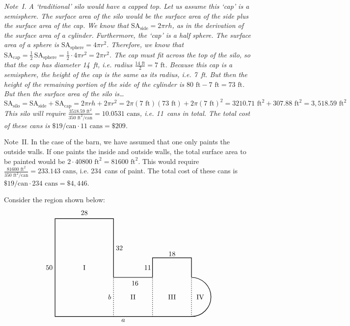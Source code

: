 \documentclass[11pt,letterpaper]{article}
\begin{document}
{\itshape
Note~I. A `traditional' silo would have a capped top. Let us assume this `cap' is a semisphere. The surface area of the silo would be the surface area of the side plus the surface area of the cap. We know that $\text{SA}_{\text{side}}= 2\pi rh$, as in the derivation of the surface area of a cylinder. Furthermore, the `cap' is a half sphere. The surface area of a sphere is $\text{SA}_{\text{sphere}}= 4\pi r^2$. Therefore, we know that $\text{SA}_{\text{cap}}= \frac{1}{2}\, \text{SA}_{\text{sphere}}= \frac{1}{2} \cdot 4\pi r^2= 2 \pi r^2$. The cap must fit across the top of the silo, so that the cap has diameter 14~ft, i.e. radius $\frac{14 \text{ ft}}{2}= 7 \text{ ft}$. Because this cap is a semisphere, the height of the cap is the same as its radius, i.e. 7~ft. But then the height of the remaining portion of the side of the cylinder is $80 \text{ ft} - 7 \text{ ft}= 73 \text{ ft}$. But then the surface area of the silo is\dots
	\[
	\text{SA}_{\text{silo}}= \text{SA}_{\text{side}} + \text{SA}_{\text{cap}}= 2\pi rh + 2\pi r^2= 2 \pi (7 \text{ ft}) (73 \text{ ft}) + 2 \pi (7 \text{ ft})^2= 3210.71 \text{ ft}^2 + 307.88 \text{ ft}^2= 3,\!518.59 \text{ ft}^2
	\]
This silo will require $\frac{3518.59 \text{ ft}^2}{350 \text{ ft}^2/\text{can}}= 10.0531 \text{ cans}$, i.e. 11~cans in total. The total cost of these cans is $\$19/\text{can} \cdot 11 \text{ cans}= \$209$. \pspace

Note~II. In the case of the barn, we have assumed that one only paints the outside walls. If one paints the inside and outside walls, the total surface area to be painted would be $2 \cdot 40800 \text{ ft}^2= 81600 \text{ ft}^2$. This would require $\frac{81600 \text{ ft}^2}{350 \text{ ft}^2/\text{can}}= 233.143 \text{ cans}$, i.e. 234~cans of paint. The total cost of these cans is $\$19/\text{can} \cdot 234 \text{ cans}= \$4,\!446$.

}



\newpage



 Consider the region shown below:
	\[
	\begin{tikzpicture}
	\draw[line width=0.03cm] (7,0) -- (0,0) -- (0,5) -- (3,5) -- (3,2) -- (5,2) -- (5,3) -- (7,3) -- (7,2);
	\draw[line width=0.03cm] (7,0) arc(270:450:1);
	
	\node at (-0.3,2.5) {$50$};
	\node at (1.5,5.3) {$28$};
	\node at (3.3,3.5) {$32$};
	\node at (4.75,2.5) {$11$};
	\node at (4.1,1.7) {$16$};
	\node at (6,3.2) {$18$};
	
	\draw[line width=0.03cm,dotted] (3,0) -- (3,2);
	\draw[line width=0.03cm,dotted] (5,0) -- (5,2);
	\draw[line width=0.03cm,dotted] (7,0) -- (7,2);
	
	\node at (2.8,1) {$b$};
	\node at (3.5,-0.2) {$a$};
	\node at (1.5,2.5) {I};
	\node at (4,1) {II};
	\node at (6,1) {III};
	\node at (7.45,1) {IV};
	\end{tikzpicture}
	\]
\end{document}
